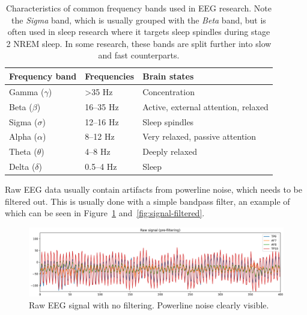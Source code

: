     \begin{table}
        \centering
        \begin{tabular}{lll}
            \toprule
            Frequency band & Frequencies & Brain states \\
            \midrule
            Gamma ($\gamma$) & >35 Hz & Concentration \\
            Beta ($\beta$) & 16--35 Hz & Active, external attention, relaxed \\
            Sigma ($\sigma$) & 12--16 Hz & Sleep spindles \\
            Alpha ($\alpha$) & 8--12 Hz & Very relaxed, passive attention \\
            Theta ($\theta$) & 4--8 Hz & Deeply relaxed \\
            Delta ($\delta$) & 0.5--4 Hz & Sleep \\
            \bottomrule
        \end{tabular}
        \caption{Characteristics of common frequency bands used in EEG research. Note the \emph{Sigma} band, which is usually grouped with the \emph{Beta} band, but is often used in sleep research where it targets sleep spindles during stage 2 NREM sleep. In some research, these bands are split further into slow and fast counterparts.}\label{table:freq-bands}
    \end{table}


    Raw EEG data usually contain artifacts from powerline noise, which needs to be filtered out. This is usually done with a simple bandpass filter, an example of which can be seen in Figure~\ref{fig:signal-unfiltered} and~\ref{fig:signal-filtered}.
    
    \begin{figure}[H]
        \includegraphics[width=14cm]{img/raw-signal-prefilter.png}
        \caption{Raw EEG signal with no filtering. Powerline noise clearly visible.}\label{fig:signal-unfiltered}
    \end{figure}

